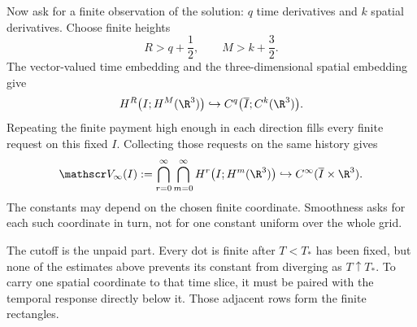 Now ask for a finite observation of the solution: \(q\) time derivatives and
\(k\) spatial derivatives.  Choose finite heights
\[
  R>q+\frac12,
  \qquad
  M>k+\frac32.
\]
The vector-valued time embedding and the three-dimensional spatial embedding
\parencite[Theorem~7.28]{Cerda2010} give
\[
  H^R\bigl(I;H^M(\R^3)\bigr)
  \hookrightarrow
  C^q\bigl(\overline I;C^k(\R^3)\bigr).
\]
Repeating the finite payment high enough in each direction fills every finite
request on this fixed \(I\).  Collecting those requests on the same history
gives
\begin{equation}\label{eq:BodyFormalMixedIntersection}
  \mathscr V_\infty(I)
  :=\bigcap_{r=0}^{\infty}\bigcap_{m=0}^{\infty}
  H^r\bigl(I;H^m(\R^3)\bigr)
  \hookrightarrow C^\infty(\overline I\times\R^3).
\end{equation}
The constants may depend on the chosen finite coordinate.  Smoothness asks for
each such coordinate in turn, not for one constant uniform over the whole
grid.

The cutoff is the unpaid part.  Every dot is finite after \(T<T_*\) has been
fixed, but none of the estimates above prevents its constant from diverging as
\(T\uparrow T_*\).  To carry one spatial coordinate to that time slice, it
must be paired with the temporal response directly below it.  Those adjacent
rows form the finite rectangles.
